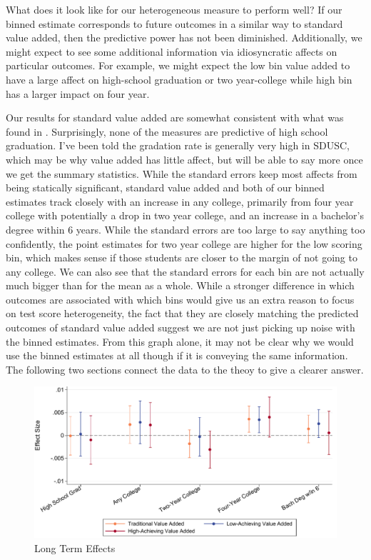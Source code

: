 \documentclass[12pt]{article}
\theoremstyle{definition}
\theoremstyle{definition}
\theoremstyle{definition}
\theoremstyle{definition}
\begin{document}
    What does it look like for our heterogeneous measure to perform well? If our binned estimate corresponds to future outcomes in a similar way to standard value added, then the predictive power has not been diminished. Additionally, we might expect to see some additional information via idiosyncratic affects on particular outcomes. For example, we might expect the low bin value added to have a large affect on high-school graduation or two year-college while high bin has a larger impact on four year. 

    Our results for standard value added are somewhat consistent with what was found in \cite{chetty2014measuring2}. Surprisingly, none of the measures are predictive of high school graduation. I've been told the gradation rate is generally very high in SDUSC, which may be why value added has little affect, but will be able to say more once we get the summary statistics. While the standard errors keep most affects from being statically significant, standard value added and both of our binned estimates track closely with an increase in any college, primarily from four year college with potentially a drop in two year college, and an increase in a bachelor's degree within 6 years. While the standard errors are too large to say anything too confidently, the point estimates for two year college are higher for the low scoring bin, which makes sense if those students are closer to the margin of not going to any college. We can also see that the standard errors for each bin are not actually much bigger than for the mean as a whole. While a stronger difference in which outcomes are associated with which bins would give us an extra reason to focus on test score heterogeneity, the fact that they are closely matching the predicted outcomes of standard value added suggest we are not just picking up noise with the binned estimates. From this graph alone, it may not be clear why we would use the binned estimates at all though if it is conveying the same information. The following two sections connect the data to the theoy to give a clearer answer. 

    \begin{figure}[H]
    \begin{center}
    \includegraphics[width=.9\textwidth]{Working_Paper/WP_Figures/fig2b_longterm.pdf}
    \end{center}
        \caption{Long Term Effects}
        \label{fig_long_term}
    \end{figure}
\end{document}
